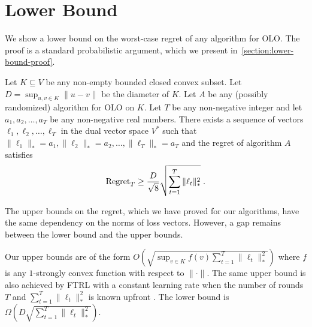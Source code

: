 \section{Lower Bound}
\label{section:lower-bound}

We show a lower bound on the worst-case regret of any algorithm for OLO. The
proof is a standard probabilistic argument, which we present
in~\ref{section:lower-bound-proof}.

\begin{theorem}
\label{theorem:simple-lower-bound}
Let $K \subseteq V$ be any non-empty bounded closed convex subset. Let $D =
\sup_{u,v \in K} \|u - v\|$ be the diameter of $K$. Let $A$ be any (possibly
randomized) algorithm for OLO on $K$. Let $T$ be any non-negative integer and
let $a_1, a_2, \dots, a_T$ be any non-negative real numbers.  There exists a
sequence of vectors $\ell_1, \ell_2, \dots, \ell_T$ in the dual vector space
$V^*$ such that $\|\ell_1\|_* = a_1, \|\ell_2\|_* = a_2, \dots, \|\ell_T\|_* =
a_T$ and the regret of algorithm $A$ satisfies
\begin{equation}
\label{equation:simple-lower-bound}
\operatorname{Regret}_T \ge \frac{D}{\sqrt{8}} \sqrt{\sum_{t=1}^T\|\ell_t\|_*^2} \; .
\end{equation}
\end{theorem}

The upper bounds on the regret, which we have proved for our algorithms, have
the same dependency on the norms of loss vectors.  However, a gap remains
between the lower bound and the upper bounds.

Our upper bounds are of the form $O(\sqrt{\sup_{v \in K} f(v) \sum_{t=1}^T
\|\ell_t\|_*^2})$ where $f$ is any $1$-strongly convex function with respect to
$\|\cdot\|$.  The same upper bound is also achieved by \textsc{FTRL} with a
constant learning rate when the number of rounds $T$ and $\sum_{t=1}^T
\|\ell_t\|_*^2$ is known upfront \cite[Chapter 2]{Shalev-Shwartz-2011}.  The
lower bound is $\Omega(D\sqrt{\sum_{t=1}^T \|\ell_t\|_*^2})$.

